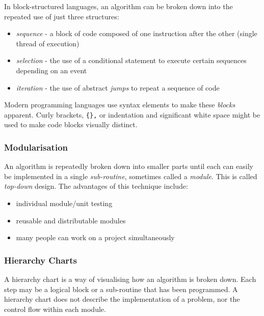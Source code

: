 \documentclass[9pt]{article}
\begin{document}
In block-structured languages, an algorithm can be broken down into the repeated use of just three structures:

\begin{itemize}
\item \emph{sequence} -  a block of code composed of one instruction after the other (single thread of execution)
\item \emph{selection} - the use of a conditional statement to execute certain sequences depending on an event
\item \emph{iteration} - the use of abstract \emph{jumps} to repeat a sequence of code
\end{itemize}

Modern programming languages use syntax elements to make these \emph{blocks} apparent. Curly brackets, \texttt{\{\},} or indentation and significant white space might be used to make code blocks visually distinct.

\subsubsection{Modularisation}
\label{sec:org0fca1cd}

An algorithm is repeatedly broken down into smaller parts until each can easily be implemented in a single \emph{sub-routine}, sometimes called a \emph{module}. This is called \emph{top-down} design. The advantages of this technique include:

\begin{itemize}
\item individual module/unit testing
\item reusable and distributable modules
\item many people can work on a project simultaneously
\end{itemize}

\subsubsection{Hierarchy Charts}
\label{sec:org4702830}

A hierarchy chart is a way of visualising how an algorithm is broken down. Each step may be a logical block or a sub-routine that has been programmed. A hierarchy chart does not describe the implementation of a problem, nor the control flow within each module.
\end{document}
